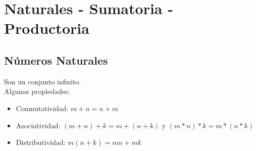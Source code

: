 \documentclass[10pt,a4paper]{article}
\begin{document}
\section*{Naturales - Sumatoria - Productoria}
\subsection*{Números Naturales}
Son un conjunto infinito. \\
Algunas propiedades:
\begin{itemize}
    \item Conmutatividad: $ m+n = n+m$
    \item Asociatividad: $(m+n)+k = m+(n+k)$ y $ (m\ast n)\ast k = m\ast (n\ast k)$
    \item Distributividad: $m(n+k) = mn + mk$
\end{itemize}
\end{document}
